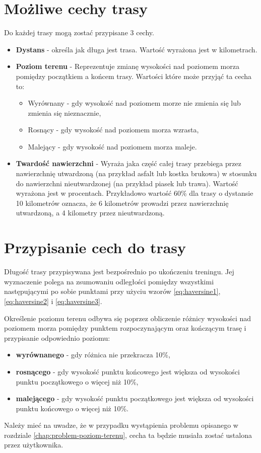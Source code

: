 \section{Możliwe cechy trasy}\label{chap:opis-cech}
Do każdej trasy mogą zostać przypisane 3 cechy.
\begin{itemize}
\item{\textbf{Dystans}} - określa jak długa jest trasa. Wartość wyrażona jest w kilometrach.
\item{\textbf{Poziom terenu}} - Reprezentuje zmianę wysokości nad poziomem morza pomiędzy początkiem a końcem trasy. Wartości które może przyjąć ta cecha to:
\begin{itemize}
\item{Wyrównany} - gdy wysokość nad poziomem morze nie zmienia się lub zmienia się nieznacznie,
\item{Rosnący} - gdy wysokość nad poziomem morza wzrasta,
\item{Malejący} - gdy wysokość nad poziomem morza maleje.
\end{itemize}
\item{\textbf{Twardość nawierzchni}} - Wyraża jaka część całej trasy przebiega przez nawierzchnię utwardzoną (na przykład asfalt lub kostka brukowa) w stosunku do nawierzchni nieutwardzonej (na przykład piasek lub trawa). Wartość wyrażona jest w procentach. Przykładowo wartość 60\% dla trasy o dystansie 10 kilometrów oznacza, że 6 kilometrów prowadzi przez nawierzchnię utwardzoną, a 4 kilometry przez nieutwardzoną.
\end{itemize}
\section{Przypisanie cech do trasy}
Długość trasy przypisywana jest bezpośrednio po ukończeniu treningu. Jej wyznaczenie polega na zsumowaniu odległości pomiędzy wszystkimi następującymi po sobie punktami przy użyciu wzorów \ref{eq:haversine1},  \ref{eq:haversine2} i \ref{eq:haversine3}.

Określenie poziomu terenu odbywa się poprzez obliczenie różnicy wysokości nad poziomem morza pomiędzy punktem rozpoczynającym oraz kończącym trasę i przypisanie odpowiednio poziomu:
\begin{itemize}
\item{\textbf{wyrównanego}} - gdy różnica nie przekracza 10\%,
\item{\textbf{rosnącego}} - gdy wysokość punktu końcowego jest większa od wysokości punktu początkowego o więcej niż 10\%,
\item{\textbf{malejącego}} - gdy wysokość punktu początkowego jest większa od wysokości punktu końcowego o więcej niż 10\%.
\end {itemize}
Należy mieć na uwadze, że w przypadku wystąpienia problemu opisanego w rozdziale \ref{chap:problem-poziom-terenu}, cecha ta będzie musiała zostać ustalona przez użytkownika.

